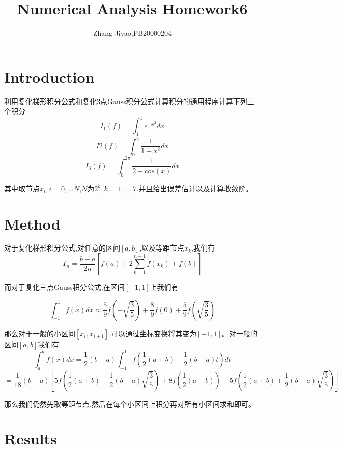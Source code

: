 \documentclass{article}
\title{Numerical Analysis Homework6}
\author{Zhang Jiyao,PB20000204}
\begin{document}
	\maketitle
	
	\section{Introduction}
	
	利用复化梯形积分公式和复化3点Gauss积分公式计算积分的通用程序计算下列三个积分
	\begin{equation}
    I_1(f)=\int_0^{1}e^{-x^2}dx
	\end{equation}
    \begin{equation}
	I2(f)=\int_0^{4}\frac{1}{1+x^2}dx
    \end{equation}
    \begin{equation}
	I_3(f)=\int_0^{2\pi}\frac{1}{2+cos(x)}dx
    \end{equation}
	
	其中取节点$x_i,i=0,...N$,$N$为$2^k,k=1,...,7$.并且给出误差估计以及计算收敛阶。
	
	\section{Method}
	
	对于复化梯形积分公式,对任意的区间$[a,b]$,以及等距节点${x_k}$,我们有
	$$ T_n = \frac{b-a}{2n}[f(a)+2\sum_{k=1}^{n-1}f(x_k)+f(b)]$$
	
	而对于复化三点Gauss积分公式,在区间$[-1,1]$上我们有

	$$	\int_{-1}^{1}f(x)dx \approx \dfrac{5}{9}f(-\sqrt{\dfrac{3}{5}})+\dfrac{8}{9}f(0)+\dfrac{5}{9}f(\sqrt{\dfrac{3}{5}})$$
	
	那么对于一般的小区间$[x_i,x_{i+1}]$,可以通过坐标变换将其变为$[-1,1]$。对一般的区间$[a,b]$我们有
	$$\int_{a}^{b}f(x)dx=\frac{1}{2}(b-a)\int_{-1}^{1}f(\frac{1}{2}(a+b)+\frac{1}{2}(b-a)t)dt$$
    $$=\frac{1}{18}(b-a)[5f(\frac{1}{2}(a+b)-\frac{1}{2}(b-a) \sqrt{\frac{3}{5}})+8f(\frac{1}{2}(a+b))+5f(\frac{1}{2}(a+b)+\frac{1}{2}(b-a)\sqrt{\frac{3}{5}})] $$
	
	那么我们仍然先取等距节点,然后在每个小区间上积分再对所有小区间求和即可。
	


	
	
	
	
	
	\section{Results}
	
\end{document}
